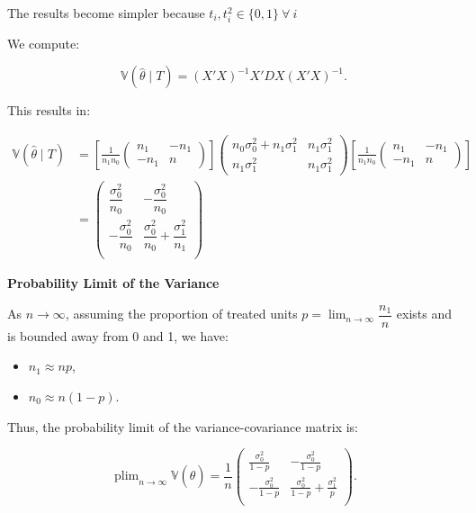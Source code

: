 \documentclass{article}
\begin{document}
The results become simpler because $t_i, t_i^2 \in \{0, 1\} \ \forall \ i$

We compute:

\[
\mathbb{V}(\hat{\theta} \mid T) = (X'X)^{-1} X' D X (X'X)^{-1}.
\]

This results in:

\begin{align*}
  \mathbb{V}(\hat{\theta} \mid T)
  & = 
  \left[
  \frac{1}{n_1 n_0} \begin{pmatrix}
    n_1 & -n_1 \\
    - n_1 & n
    \end{pmatrix}
  \right]
  \begin{pmatrix}
    n_0 \sigma_0^2 + n_1 \sigma_1^2 & n_1 \sigma_1^2 \\
    n_1 \sigma_1^2 & n_1 \sigma_1^2
    \end{pmatrix}
  \left[
    \frac{1}{n_1 n_0} \begin{pmatrix}
      n_1 & -n_1 \\
      - n_1 & n
      \end{pmatrix}
    \right] \\
  &=
  \begin{pmatrix}
    \dfrac{\sigma_0^2}{n_0} & - \dfrac{\sigma_0^2}{n_0} \\
    - \dfrac{\sigma_0^2}{n_0} & \dfrac{\sigma_0^2}{n_0} + \dfrac{\sigma_1^2}{n_1} \\
    \end{pmatrix}
\end{align*}

\textbf{Probability Limit of the Variance}

As \(n \to \infty\), assuming the proportion of treated units \(p = \lim_{n \to \infty} \dfrac{n_1}{n}\) exists and is bounded away from 0 and 1, we have:

\begin{itemize}
  \item \(n_1 \approx n p\),
  \item \(n_0 \approx n (1 - p)\).
\end{itemize}

Thus, the probability limit of the variance-covariance matrix is:

\[
\operatorname{plim}_{n \to \infty} \mathbb{V}(\hat{\theta}) = \dfrac{1}{n} \begin{pmatrix}
\frac{\sigma_0^2}{1 - p} & - \frac{\sigma_0^2}{1 - p} \\
- \frac{\sigma_0^2}{1 - p} & \frac{\sigma_0^2}{1 - p} + \frac{\sigma_1^2}{p} \\
\end{pmatrix}.
\]
\end{document}
